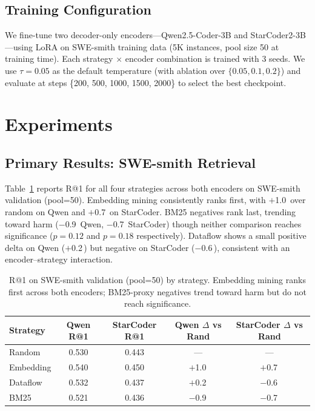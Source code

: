 \documentclass[11pt]{article}
\newcommand{\pp}{\,\text{pp}}
\begin{document}
\subsection{Training Configuration}

We fine-tune two decoder-only encoders---Qwen2.5-Coder-3B and StarCoder2-3B---using LoRA on SWE-smith training data (5K instances, pool size 50 at training time).
Each strategy $\times$ encoder combination is trained with 3 seeds.
We use $\tau = 0.05$ as the default temperature (with ablation over $\{0.05, 0.1, 0.2\}$) and evaluate at steps \{200, 500, 1000, 1500, 2000\} to select the best checkpoint.

\section{Experiments}
\label{sec:experiments}

\subsection{Primary Results: SWE-smith Retrieval}
\label{sec:primary}

Table~\ref{tab:four-strategy} reports R@1 for all four strategies across both encoders on SWE-smith validation (pool=50).
Embedding mining consistently ranks first, with $+$1.0\pp{} over random on Qwen and $+$0.7\pp{} on StarCoder.
BM25 negatives rank last, trending toward harm ($-$0.9\pp{} Qwen, $-$0.7\pp{} StarCoder) though neither comparison reaches significance ($p = 0.12$ and $p = 0.18$ respectively).
Dataflow shows a small positive delta on Qwen ($+$0.2\pp{}) but negative on StarCoder ($-$0.6\pp{}), consistent with an encoder--strategy interaction.

\begin{table}[t]
\centering
\caption{R@1 on SWE-smith validation (pool=50) by strategy. Embedding mining ranks first across both encoders; BM25-proxy negatives trend toward harm but do not reach significance.}
\label{tab:four-strategy}
\begin{tabular}{lcccc}
\toprule
Strategy & Qwen R@1 & StarCoder R@1 & Qwen $\Delta$ vs Rand & StarCoder $\Delta$ vs Rand \\
\midrule
Random    & 0.530 & 0.443 & ---   & --- \\
Embedding & 0.540 & 0.450 & $+$1.0\pp{} & $+$0.7\pp{} \\
Dataflow  & 0.532 & 0.437 & $+$0.2\pp{} & $-$0.6\pp{} \\
BM25      & 0.521 & 0.436 & $-$0.9\pp{} & $-$0.7\pp{} \\
\bottomrule
\end{tabular}
\end{table}
\end{document}
